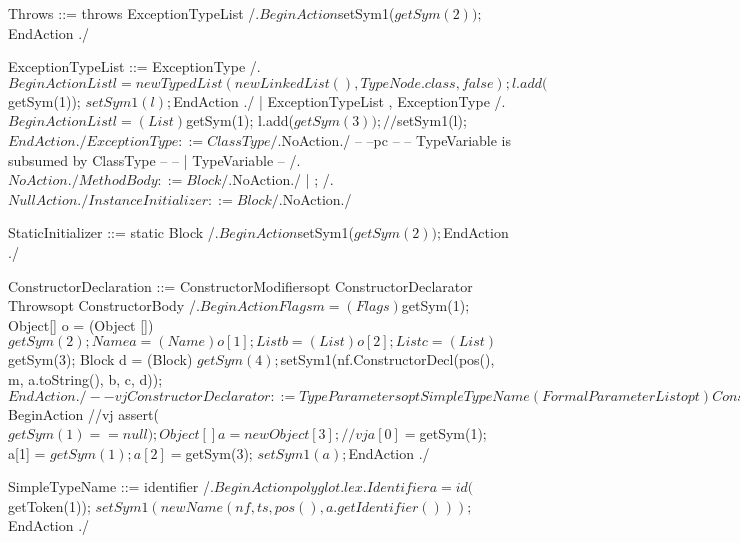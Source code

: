     Throws ::= throws ExceptionTypeList
        /.$BeginAction
                    $setSym1($getSym(2));
          $EndAction
        ./
    
    ExceptionTypeList ::= ExceptionType
        /.$BeginAction
                    List l = new TypedList(new LinkedList(), TypeNode.class, false);
                    l.add($getSym(1));
                    $setSym1(l);
          $EndAction
        ./
                        | ExceptionTypeList , ExceptionType
        /.$BeginAction
                    List l = (List) $getSym(1);
                    l.add($getSym(3));
                    // $setSym1(l);
          $EndAction
        ./
    
    ExceptionType ::= ClassType
        /.$NoAction./
--
--pc
--
-- TypeVariable is subsumed by ClassType
--
--                    | TypeVariable
--        /.$NoAction./
    
    MethodBody ::= Block
        /.$NoAction./
                 | ;
        /.$NullAction./
    
    InstanceInitializer ::= Block
        /.$NoAction./
    
    StaticInitializer ::= static Block
        /.$BeginAction
                    $setSym1($getSym(2));
          $EndAction
        ./
    
    ConstructorDeclaration ::= ConstructorModifiersopt ConstructorDeclarator Throwsopt ConstructorBody
        /.$BeginAction
                    Flags m = (Flags) $getSym(1);
                    Object[] o = (Object []) $getSym(2);
                        Name a = (Name) o[1];
                        List b = (List) o[2];
                    List c = (List) $getSym(3);
                    Block d = (Block) $getSym(4);

                    $setSym1(nf.ConstructorDecl(pos(), m, a.toString(), b, c, d));
          $EndAction
        ./
    
--vj    ConstructorDeclarator ::= TypeParametersopt SimpleTypeName ( FormalParameterListopt )
    ConstructorDeclarator ::=  SimpleTypeName ( FormalParameterListopt )
        /.$BeginAction
//vj                    assert($getSym(1) == null);
                    Object[] a = new Object[3];
//vj                    a[0] = $getSym(1);
                    a[1] = $getSym(1);
                    a[2] = $getSym(3);
                    $setSym1(a);
          $EndAction
        ./
    
    SimpleTypeName ::= identifier
        /.$BeginAction
                    polyglot.lex.Identifier a = id($getToken(1));
                    $setSym1(new Name(nf, ts, pos(), a.getIdentifier()));
          $EndAction
        ./

